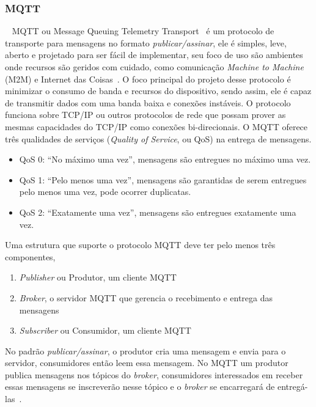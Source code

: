 \subsubsection{MQTT}
~\label{sec:mqtt}
MQTT ou Message Queuing Telemetry Transport~\cite{ISO20922} é um protocolo de transporte para mensagens no formato \emph{publicar/assinar},
ele é simples, leve, aberto e projetado para ser fácil de implementar, seu foco de uso são ambientes onde recursos são geridos com cuidado,
como comunicação \emph{Machine to Machine} (M2M) e Internet das Coisas~\cite{MQTT5}. O foco principal do projeto desse protocolo é minimizar
o consumo de banda e recursos do dispositivo, sendo assim, ele é capaz de transmitir dados com uma banda baixa e conexões instáveis.
O protocolo funciona sobre TCP/IP ou outros protocolos de rede que possam prover as mesmas capacidades do TCP/IP como conexões bi-direcionais.
O MQTT oferece três qualidades de serviços (\emph{Quality of Service}, ou QoS) na entrega de mensagens.
\begin{itemize}
    \item QoS 0: ``No máximo uma vez'', mensagens são entregues no máximo uma vez.
    \item QoS 1: ``Pelo menos uma vez'', mensagens são garantidas de serem entregues pelo menos uma vez, pode ocorrer duplicatas.
    \item QoS 2: ``Exatamente uma vez'', mensagens são entregues exatamente uma vez.
\end{itemize}
Uma estrutura que suporte o protocolo MQTT deve ter pelo menos três componentes,
\begin{enumerate}
    \item \emph{Publisher} ou Produtor, um cliente MQTT
    \item \emph{Broker}, o servidor MQTT que gerencia o recebimento e entrega das mensagens
    \item \emph{Subscriber} ou Consumidor, um cliente MQTT
\end{enumerate}
No padrão \emph{publicar/assinar}, o produtor cria uma mensagem e envia para o servidor, consumidores então leem essa mensagem.
No MQTT um produtor publica mensagens nos tópicos do \emph{broker}, consumidores interessados em receber essas mensagens se
inscreverão nesse tópico e o \emph{broker} se encarregará de entregá-las~\cite{Mishra2020}.



